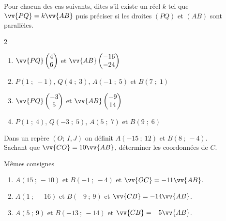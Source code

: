 \documentclass[main.tex]{subfiles}
\begin{document}
\begin{exercise} 
Pour chacun des cas suivants, dites s'il existe un réel $k$ tel que  $\vv{PQ}=k\vv{AB}$ puis préciser si les droites $(PQ)$ et $(AB)$ sont parallèles.
\begin{multicols}{2} 
\begin{enumerate}[label=\alph*),leftmargin=*]
\item $\vv{PQ}\begin{pmatrix}
4\\6
\end{pmatrix}$ et $\vv{AB}\begin{pmatrix}
-16\\-24
\end{pmatrix} $
\item $P(1\; ;\;-1)$, $Q(4\; ;\;3)$, $A(-1\; ;\;5)$ et $B(7\; ;\;1)$ 
\item $\vv{PQ}\begin{pmatrix}
-3\\5
\end{pmatrix}$ et $\vv{AB}\begin{pmatrix}
-9\\14
\end{pmatrix}$
\item $P(1\; ;\;4)$, $Q(-3\; ;\;5)$, $A(5\; ;\;7)$ et $B(9\; ;\;6)$ 
\end{enumerate}
\end{multicols}
\end{exercise}
\begin{example}[Je fais] Dans un repère $(O;~I,J)$ on définit $A(-15~;~12)$ et $B(8~;~-4)$.\\ Sachant que $\vv{CO}=10\vv{AB}$, déterminer les coordonnées de $C$.

\vfill
\end{example}
\begin{exercise} Mêmes consignes
\begin{enumerate}[label=\alph*),leftmargin=*]
\item $A(15~;~-10)$ et $B(-1~;~-4)$ et $\vv{OC}=-11\vv{AB}$. %
\item $A(1~;~-16)$ et $B(-9~;~9)$ et $\vv{CB}=-14\vv{AB}$.%
\item  $A(5~;~9)$ et $B(-13~;~-14)$ et $\vv{CB}=-5\vv{AB}$.%
\end{enumerate} 
\end{exercise}
\end{document}
